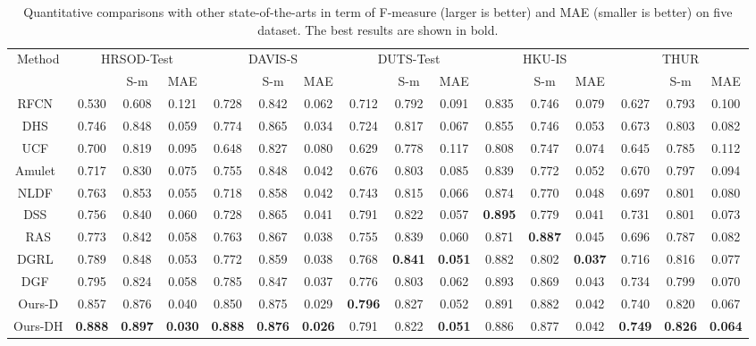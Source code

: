 \documentclass[10pt,twocolumn,letterpaper]{article}
\begin{document}
\begin{table*}
\begin{center}
\small
\setlength{\tabcolsep}{4.6pt}
\begin{tabular}{c||c|c|c|c|c|c|c|c|c|c|c|c|c|c|c|}
\toprule[2.5pt]
\multirow{2}{*}{Method}      &\multicolumn{3}{c|}{HRSOD-Test}&\multicolumn{3}{c|}{DAVIS-S}  & \multicolumn{3}{c|}{DUTS-Test}&  \multicolumn{3}{c|}{HKU-IS} & \multicolumn{3}{c|}{THUR}\\
\cline{2-16}
& &S-m&MAE&&S-m&MAE&&S-m&MAE& &S-m&MAE&&S-m&MAE\\
\midrule[1pt]
RFCN~\cite{wang2016saliency}&0.530&0.608&0.121&0.728&0.842&0.062 &0.712 &0.792&0.091&0.835&0.746&0.079&0.627&0.793&0.100\\
DHS~\cite{liu2016dhsnet} &0.746&0.848&0.059&0.774&0.865&0.034&{0.724}&0.817&{0.067}&0.855&0.746&0.053&0.673&0.803&0.082\\
UCF~\cite{zhang2017learning} &0.700&0.819&0.095&0.648&0.827&0.080&0.629&0.778&0.117&0.808&0.747&0.074&0.645&0.785&0.112\\
Amulet~\cite{zhang2017amulet}&0.717&0.830&0.075&0.755&0.848&0.042&0.676&0.803&0.085&0.839&0.772&0.052&0.670&0.797&0.094\\
NLDF~\cite{luo2017non}&0.763&0.853&0.055&0.718&0.858&0.042&0.743&0.815&0.066&0.874&0.770&0.048&0.697&0.801&0.080\\
DSS~\cite{hou2017deeply}&0.756&0.840&0.060&0.728&0.865&0.041&0.791&0.822&{0.057}&\textbf{0.895}&0.779&0.041&0.731&0.801&0.073\\
RAS\cite{chen2018reverse}&0.773&0.842&0.058&0.763&0.867&0.038&0.755&0.839&0.060&0.871&\textbf{0.887}&0.045&0.696&0.787&0.082\\
DGRL~\cite{wang2018detect}&0.789&0.848&0.053&0.772&0.859&0.038&0.768&\textbf{0.841}&\textbf{0.051}&0.882&0.802&\textbf{0.037}&0.716&0.816&0.077\\
DGF~\cite{wu2018fast}&0.795&0.824&0.058&0.785&0.847&0.037&0.776&0.803&0.062&0.893&0.869&0.043&0.734&0.799&0.070\\
\midrule[1pt]
Ours-D&0.857&0.876&0.040&0.850&0.875&0.029&\textbf{0.796}&0.827&0.052&0.891&0.882&0.042&0.740&0.820&0.067\\
Ours-DH&\textbf{0.888}&\textbf{0.897}&\textbf{0.030}&\textbf{0.888}&\textbf{0.876}&\textbf{0.026}&0.791&0.822&\textbf{0.051}&0.886&0.877&0.042&\textbf{0.749}&\textbf{0.826}&\textbf{0.064}
\\
\bottomrule[1.5pt]
\end{tabular}
\end{center}
\caption{Quantitative comparisons with other state-of-the-arts in term of F-measure (larger is better) and MAE (smaller is better) on five dataset. The best results are shown in bold.}\label{tab-state}
\vspace{-4mm}
\end{table*}
\end{document}
